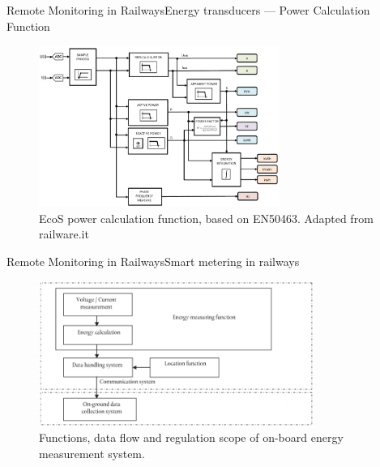 \begin{frame}{Remote Monitoring in Railways}{Energy transducers --- Power Calculation Function}


\begin{figure}[h!]
	\centering
	\includegraphics[width=0.7\textwidth,keepaspectratio]{figures/32.EnergyS/energy_calculation}
	\caption{EcoS power calculation function, based on EN50463. Adapted from railware.it}
\end{figure}
	
	
\end{frame}

\begin{frame}{Remote Monitoring in Railways}{Smart metering in railways}

\begin{figure}[h!]
	\centering
	\includegraphics[width=0.8\textwidth,keepaspectratio]{figures/34.SmartM/EMS}
	\caption{Functions, data flow and regulation scope of on-board energy measurement system.}
\end{figure}

\end{frame}

